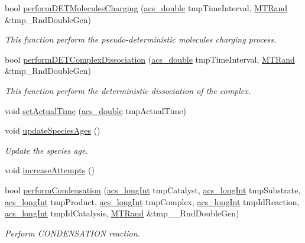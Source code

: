 \begin{DoxyCompactItemize}
bool \hyperlink{a00003_adbaf165a12edd62c614a455544807ea3}{perform\-D\-E\-T\-Molecules\-Charging} (\hyperlink{a00016_ab776853a005fcbf56af0424a2a4dd607}{acs\-\_\-double} tmp\-Time\-Interval, \hyperlink{a00008}{M\-T\-Rand} \&tmp\-\_\-\-Rnd\-Double\-Gen)
\begin{DoxyCompactList}\small\item\em This function perform the pseudo-\/deterministic molecules charging process. \end{DoxyCompactList}\item 
bool \hyperlink{a00003_a6ae793f9d2dca0632239be955dd83cee}{perform\-D\-E\-T\-Complex\-Dissociation} (\hyperlink{a00016_ab776853a005fcbf56af0424a2a4dd607}{acs\-\_\-double} tmp\-Time\-Interval, \hyperlink{a00008}{M\-T\-Rand} \&tmp\-\_\-\-Rnd\-Double\-Gen)
\begin{DoxyCompactList}\small\item\em This function perform the deterministic dissociation of the complex. \end{DoxyCompactList}\item 
void \hyperlink{a00003_a9bc445da3e89d09d4fce11c83f3dedb0}{set\-Actual\-Time} (\hyperlink{a00016_ab776853a005fcbf56af0424a2a4dd607}{acs\-\_\-double} tmp\-Actual\-Time)
\item 
void \hyperlink{a00003_adab0607255ca5927b69cb6882917e031}{update\-Species\-Ages} ()
\begin{DoxyCompactList}\small\item\em Update the species age. \end{DoxyCompactList}\item 
void \hyperlink{a00003_aac3eed768b89e3a70017075b68046ede}{increase\-Attempts} ()
\item 
bool \hyperlink{a00003_a1baf5512b7e0a8fb6f8f890ba9f99cd1}{perform\-Condensation} (\hyperlink{a00016_a19319d75f02db4308bc5c0026d98cd85}{acs\-\_\-long\-Int} tmp\-Catalyst, \hyperlink{a00016_a19319d75f02db4308bc5c0026d98cd85}{acs\-\_\-long\-Int} tmp\-Substrate, \hyperlink{a00016_a19319d75f02db4308bc5c0026d98cd85}{acs\-\_\-long\-Int} tmp\-Product, \hyperlink{a00016_a19319d75f02db4308bc5c0026d98cd85}{acs\-\_\-long\-Int} tmp\-Complex, \hyperlink{a00016_a19319d75f02db4308bc5c0026d98cd85}{acs\-\_\-long\-Int} tmp\-Id\-Reaction, \hyperlink{a00016_a19319d75f02db4308bc5c0026d98cd85}{acs\-\_\-long\-Int} tmp\-Id\-Catalysis, \hyperlink{a00008}{M\-T\-Rand} \&tmp\-\_\-\-\_\-\-Rnd\-Double\-Gen)
\begin{DoxyCompactList}\small\item\em Perform C\-O\-N\-D\-E\-N\-S\-A\-T\-I\-O\-N reaction. \end{DoxyCompactList}\item 

\end{DoxyCompactItemize}

